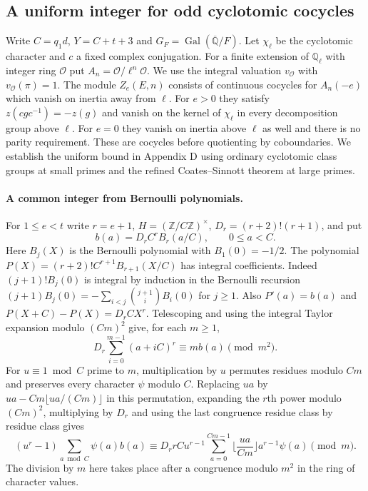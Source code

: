 \subsection{A uniform integer for odd cyclotomic cocycles}
\label{sec:odd-cocycles-reduction}
Write $C=q_1d$, $Y=C+t+3$ and $G_F=\operatorname{Gal}(\overline{\mathbb Q}/F)$.
Let $\chi_\ell$ be the cyclotomic character and $c$ a fixed complex conjugation.
For a finite extension of $\mathbb Q_\ell$ with integer ring $\mathcal O$ put
$A_n=\mathcal O/\ell^n\mathcal O$.
We use the integral valuation $v_{\mathcal O}$ with $v_{\mathcal O}(\pi)=1$.
The module $Z_e(E,n)$ consists of continuous cocycles for $A_n(-e)$
which vanish on inertia away from $\ell$. For $e>0$ they satisfy
$z(cgc^{-1})=-z(g)$ and vanish on the kernel of $\chi_\ell$ in every
decomposition group above $\ell$. For $e=0$ they vanish on inertia
above $\ell$ as well and there is no parity requirement. These are
cocycles before quotienting by coboundaries. We establish the uniform bound in Appendix D using ordinary
cyclotomic class groups at small primes and the refined Coates--Sinnott
theorem at large primes.

\paragraph{A common integer from Bernoulli polynomials.}
For $1\le e<t$ write $r=e+1$, $H=(\mathbb Z/C\mathbb Z)^\times$,
$D_r=(r+2)!(r+1)$, and put
\[
 b(a)=D_r C^r B_r(a/C),\qquad 0\le a<C.
\]
Here $B_j(X)$ is the Bernoulli polynomial with $B_1(0)=-1/2$.
The polynomial $P(X)=(r+2)!C^{r+1} B_{r+1}(X/C)$ has integral
coefficients. Indeed $(j+1)!B_j(0)$ is integral by induction in the
Bernoulli recursion $(j+1)B_j(0)=-\sum_{i<j}{j+1\choose i}B_i(0)$ for $j\ge1$.
Also $P'(a)=b(a)$ and $P(X+C)-P(X)=D_r C X^r$. Telescoping and using
the integral Taylor expansion modulo $(Cm)^2$ give, for each $m\ge1$,
\[
 D_r\sum_{i=0}^{m-1}(a+iC)^r\equiv m b(a)\pmod{m^2}.
\]
For $u\equiv1\bmod C$ prime to $m$, multiplication by $u$ permutes residues
modulo $Cm$ and preserves every character $\psi$ modulo $C$. Replacing
$ua$ by $ua-Cm\lfloor ua/(Cm)\rfloor$ in this permutation, expanding the
$r$th power modulo $(Cm)^2$, multiplying by $D_r$ and using the last
congruence residue class by residue class gives
\[
 (u^r-1)\sum_{a\bmod C}\psi(a)b(a)
 \equiv D_r r C u^{r-1}
 \sum_{a=0}^{Cm-1}\Big\lfloor\frac{ua}{Cm}\Big\rfloor a^{r-1}\psi(a)
 \pmod m .
\]
The division by $m$ here takes place after a congruence modulo $m^2$
in the ring of character values.

